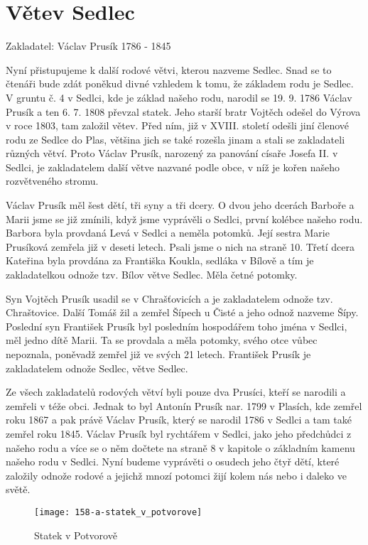 \documentclass[../dejiny-rodu-prusiku.tex]{subfiles}
\begin{document}
\chapter{Větev Sedlec}

Zakladatel: Václav Prusík 1786 - 1845

Nyní přistupujeme k další rodové větvi, kterou nazveme Sedlec. Snad se to čtenáři bude zdát poněkud divné vzhledem k tomu, že základem rodu je Sedlec. V gruntu č. 4 v Sedlci, kde je základ našeho rodu, narodil se 19. 9. 1786 Václav Prusík a ten 6. 7. 1808 převzal statek. Jeho starší bratr Vojtěch odešel do Výrova v roce 1803, tam založil větev. Před ním, již v XVIII. století odešli jiní členové rodu ze Sedlce do Plas, většina jich se také rozešla jinam a stali se zakladateli různých větví. Proto Václav Prusík, narozený za panování císaře Josefa II. v Sedlci, je zakladatelem další větve nazvané podle obce, v níž je kořen našeho rozvětveného stromu.

Václav Prusík měl šest dětí, tři syny a tři dcery. O dvou jeho dcerách Barboře a Marii jsme se již zmíni­li, když jsme vyprávěli o Sedlci, první kolébce našeho rodu. Barbora byla provdaná Levá v Sedlci a neměla po­tomků. Její sestra Marie Prusíková zemřela již v deseti letech. Psali jsme o nich na straně 10. Třetí dcera Kateřina byla provdána za Františka Koukla, sedláka v Bílově a tím je zakladatelkou odnože tzv. Bílov větve Sedlec. Měla četné potomky.

Syn Vojtěch Prusík usadil se v Chrašťovicích a je zakladatelem odnože tzv. Chraštovice. Další Tomáš žil a zem­řel Šípech u Čisté a jeho odnož nazveme Šípy. Poslední syn František Prusík byl posledním hospodářem toho jména v Sedlci, měl jedno dítě Marii. Ta se provdala a měla potomky, svého otce vůbec nepoznala, poněvadž zem­řel již ve svých 21 letech. František Prusík je zakladatelem odnože Sedlec, větve Sedlec.

Ze všech zakladatelů rodových větví byli pouze dva Prusíci, kteří se narodili a zemřeli v téže obci. Jednak to byl Antonín Prusík nar. 1799 v Plasích, kde zemřel roku 1867 a pak právě Václav Prusík, který se narodil 1786 v Sedlci a tam také zemřel roku 1845. Václav Prusík byl rychtářem v Sedlci, jako jeho předchůdci z našeho rodu a více se o něm dočtete na straně 8 v kapitole o základ­ním kamenu našeho rodu v Sedlci. Nyní budeme vyprávěti o osudech jeho čtyř dětí, které založily odnože rodové a jejichž mnozí potomci žijí kolem nás nebo i daleko ve světě.

\begin{figure}
\centering
\texttt{[image: 158-a-statek\_v\_potvorove]}
\caption{Statek v Potvorově }
\label{fig:158-a-statek_v_potvorove}
\end{figure}
\end{document}
